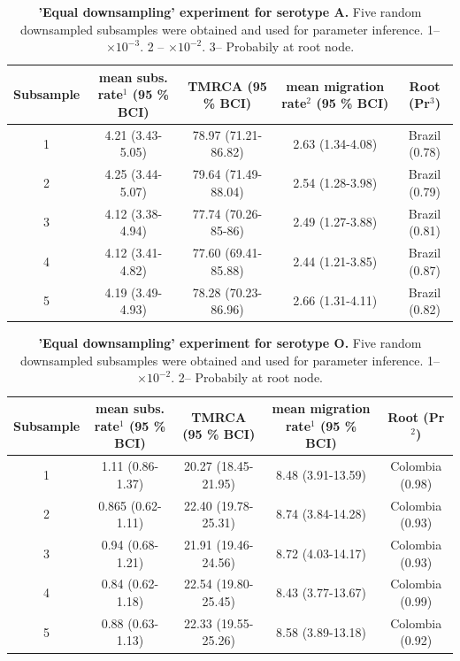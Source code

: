 \documentclass[a4paper,10pt]{article}
\begin{document}
\newpage
\begin{table}
\medskip
\begin{minipage}{\textwidth} 
\begin{center}
\caption{ {{\bf 'Equal downsampling' experiment for serotype A.}} 
Five random downsampled subsamples were obtained and used for parameter inference.
1-- $\times 10^{-3}$. 2 -- $\times 10^{-2}$. 3-- Probabily at root node.}
\begin{tabular}{ccccc}
\toprule
Subsample	&mean subs. rate$^{1}$ (95 \% BCI)	&TMRCA (95 \% BCI)	&mean migration rate$^{2}$  (95 \% BCI)	&Root (Pr$^{3}$)\\
\midrule
1	&4.21 (3.43-5.05)	&78.97 (71.21-86.82)	&2.63 (1.34-4.08)	&Brazil (0.78)\\
2	&4.25 (3.44-5.07)	&79.64 (71.49-88.04)	&2.54 (1.28-3.98)	&Brazil (0.79)\\
3	&4.12 (3.38-4.94)	&77.74 (70.26-85-86)	&2.49 (1.27-3.88)	&Brazil (0.81)\\
4	&4.12 (3.41-4.82)	&77.60 (69.41-85.88)	&2.44 (1.21-3.85)	&Brazil (0.87)\\
5	&4.19 (3.49-4.93)	&78.28 (70.23-86.96)	&2.66 (1.31-4.11)	&Brazil (0.82)\\
\bottomrule
\end{tabular}
\label{tab:ED_A}
\end{center}
\end{minipage}
\end{table}

\newpage
\begin{table}
\medskip
\begin{minipage}{\textwidth}
\begin{center}
 \caption{ {{\bf 'Equal downsampling' experiment for serotype O.}} Five random downsampled subsamples were obtained and used for parameter inference.
1-- $\times 10^{-2}$. 2--  Probabily at root node.}
\begin{tabular}{ccccc}
\toprule
Subsample	&mean subs. rate$^{1}$ (95 \% BCI)	&TMRCA (95 \% BCI)	&mean migration rate$^{1}$ (95 \% BCI)	&Root (Pr$^{2}$)\\
\midrule
1	&1.11 (0.86-1.37)	&20.27 (18.45-21.95)	&8.48 (3.91-13.59)	&Colombia (0.98)\\
2	&0.865 (0.62-1.11)	&22.40 (19.78-25.31)	&8.74 (3.84-14.28)	&Colombia (0.93)\\
3	&0.94 (0.68-1.21)	&21.91 (19.46-24.56)	&8.72 (4.03-14.17)	&Colombia (0.93)\\
4	&0.84 (0.62-1.18)	&22.54 (19.80-25.45)	&8.43 (3.77-13.67)	&Colombia (0.99)\\
5	&0.88 (0.63-1.13)	&22.33 (19.55-25.26)	&8.58 (3.89-13.18)	&Colombia (0.92)\\

\bottomrule
\end{tabular}
\label{tab:ED_O}
\end{center}
\end{minipage}
\end{table}
\end{document}

